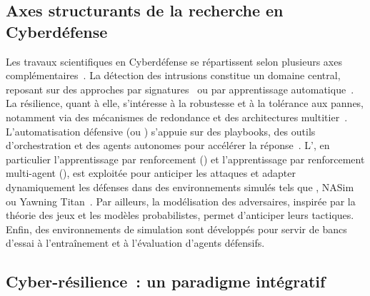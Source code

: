 

\subsection*{Axes structurants de la recherche en Cyberdéfense}

Les travaux scientifiques en Cyberdéfense se répartissent selon plusieurs axes complémentaires~\cite{Buczak2016}. La détection des intrusions constitue un domaine central, reposant sur des approches par signatures~\cite{Axelsson2000} ou par apprentissage automatique~\cite{Sommer2010,Buczak2016}. La résilience, quant à elle, s'intéresse à la robustesse et à la tolérance aux pannes, notamment via des mécanismes de redondance et des architectures multitier~\cite{Bodeau2011}. L'automatisation défensive (ou ) s'appuie sur des playbooks, des outils d'orchestration et des agents autonomes pour accélérer la réponse~\cite{Hazra2022}. L', en particulier l'apprentissage par renforcement () et l'apprentissage par renforcement multi-agent (), est exploitée pour anticiper les attaques et adapter dynamiquement les défenses dans des environnements simulés tels que , NASim ou Yawning Titan~\cite{Standen2021, nasim2023,Andrew2022}. Par ailleurs, la modélisation des adversaires, inspirée par la théorie des jeux et les modèles probabilistes, permet d'anticiper leurs tactiques. Enfin, des environnements de simulation sont développés pour servir de bancs d'essai à l'entraînement et à l'évaluation d'agents défensifs.


\subsection*{Cyber-résilience~: un paradigme intégratif}

